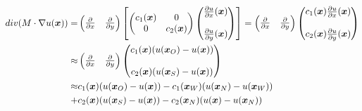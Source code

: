 \documentclass{article}
\theoremstyle{plain}
\theoremstyle{definition}
\numberwithin{equation}{section}
\begin{document}
\begin{enumerate}[label=\alph*)]
        \begin{align*}div(M \cdot \nabla u(\boldsymbol{x})) =& \begin{pmatrix}
            \frac{\partial}{\partial x} & \frac{\partial}{\partial y}
        \end{pmatrix}
        \left[ \begin{pmatrix}
        c_1(\boldsymbol{x}) & 0\\
        0 & c_2(\boldsymbol{x})
        \end{pmatrix}
        \begin{pmatrix}
            \frac{\partial u}{\partial x} (\boldsymbol{x})\\
            \ \\
            \frac{\partial u}{\partial y} (\boldsymbol{x})
        \end{pmatrix}
        \right]
        = \begin{pmatrix}
        \frac{\partial}{\partial x} & \frac{\partial}{\partial y}
        \end{pmatrix}
        \begin{pmatrix}
            c_1(\boldsymbol{x}) \frac{\partial u}{\partial x} (\boldsymbol{x})\\
            \ \\
            c_2(\boldsymbol{x}) \frac{\partial u}{\partial y} (\boldsymbol{x})
        \end{pmatrix}\\
        \approx & \begin{pmatrix}
        \frac{\partial}{\partial x} & \frac{\partial}{\partial y}
        \end{pmatrix}
        \begin{pmatrix}
            c_1(\boldsymbol{x}) (u(\boldsymbol{x}_O) - u(\boldsymbol{x})) \\
            \ \\
            c_2(\boldsymbol{x}) (u(\boldsymbol{x}_S) - u(\boldsymbol{x})) 
        \end{pmatrix}\\
        \approx & c_1(\boldsymbol{x}) (u(\boldsymbol{x}_O) - u(\boldsymbol{x})) - c_1(\boldsymbol{x}_W)(u(\boldsymbol{x}_N) - u(\boldsymbol{x}_W))\\
        +&c_2(\boldsymbol{x}) (u(\boldsymbol{x}_S) - u(\boldsymbol{x})) - c_2(\boldsymbol{x}_N)(u(\boldsymbol{x}) - u(\boldsymbol{x}_N))
        \end{align*}
      \end{enumerate}

      

    \printindex
\end{document}
